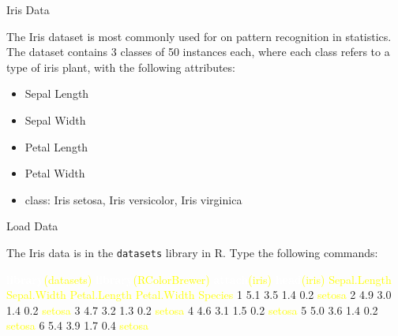 \documentclass[ignorenonframetext,]{beamer}
\newenvironment{Shaded}{\begin{snugshade}}{\end{snugshade}}
\newcommand{\KeywordTok}[1]{\textcolor{white}{\textbf{{#1}}}}
\newcommand{\NormalTok}[1]{\textcolor{yellow}{{#1}}}
\newcommand{\DecValTok}[1]{\textcolor{numbercolor}{{#1}}}
\newcommand{\FloatTok}[1]{\textcolor{numbercolor}{{#1}}}
\providecommand{\tightlist}{%
  \setlength{\itemsep}{0pt}\setlength{\parskip}{0pt}}
\begin{document}
\begin{frame}{Iris Data}

The Iris dataset is most commonly used for on pattern recognition in
statistics. The dataset contains 3 classes of 50 instances each, where
each class refers to a type of iris plant, with the following
attributes:

\begin{itemize}
\tightlist
\item
  Sepal Length
\item
  Sepal Width
\item
  Petal Length\\
\item
  Petal Width
\item
  class: Iris setosa, Iris versicolor, Iris virginica
\end{itemize}

\end{frame}

\begin{frame}[fragile]{Load Data}

The Iris data is in the \texttt{datasets} library in R. Type the
following commands:

\small

\begin{Shaded}
\begin{Highlighting}[]
\KeywordTok{library}\NormalTok{(datasets)}
\KeywordTok{library}\NormalTok{(RColorBrewer)}
\KeywordTok{attach}\NormalTok{(iris)}
\KeywordTok{head}\NormalTok{(iris)}
  \NormalTok{Sepal.Length Sepal.Width Petal.Length Petal.Width Species}
\DecValTok{1}          \FloatTok{5.1}         \FloatTok{3.5}          \FloatTok{1.4}         \FloatTok{0.2}  \NormalTok{setosa}
\DecValTok{2}          \FloatTok{4.9}         \FloatTok{3.0}          \FloatTok{1.4}         \FloatTok{0.2}  \NormalTok{setosa}
\DecValTok{3}          \FloatTok{4.7}         \FloatTok{3.2}          \FloatTok{1.3}         \FloatTok{0.2}  \NormalTok{setosa}
\DecValTok{4}          \FloatTok{4.6}         \FloatTok{3.1}          \FloatTok{1.5}         \FloatTok{0.2}  \NormalTok{setosa}
\DecValTok{5}          \FloatTok{5.0}         \FloatTok{3.6}          \FloatTok{1.4}         \FloatTok{0.2}  \NormalTok{setosa}
\DecValTok{6}          \FloatTok{5.4}         \FloatTok{3.9}          \FloatTok{1.7}         \FloatTok{0.4}  \NormalTok{setosa}
\end{Highlighting}
\end{Shaded}

\end{frame}
\end{document}
